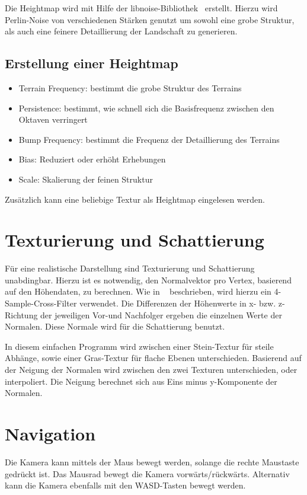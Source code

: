 \documentclass[a4paper,10pt]{article}
\begin{document}
Die Heightmap wird mit Hilfe der libnoise-Bibliothek~\cite{libnoise} erstellt. Hierzu wird Perlin-Noise von verschiedenen Stärken genutzt um sowohl eine grobe Struktur, als auch eine feinere Detaillierung der Landschaft zu generieren. 

\subsection*{Erstellung einer Heightmap}
\begin{itemize}
\item Terrain Frequency: bestimmt die grobe Struktur des Terrains
\item Persistence: bestimmt, wie schnell sich die Basisfrequenz zwischen den Oktaven verringert
\item Bump Frequency: bestimmt die Frequenz der Detaillierung des Terrains
\item Bias: Reduziert oder erhöht Erhebungen
\item Scale: Skalierung der feinen Struktur
\end{itemize}

Zusätzlich kann eine beliebige Textur als Heightmap eingelesen werden.

\section*{Texturierung und Schattierung}

Für eine realistische Darstellung sind Texturierung und Schattierung unabdingbar. Hierzu ist es notwendig, den Normalvektor pro Vertex, basierend auf den Höhendaten, zu berechnen. Wie in ~\cite{frostbite} beschrieben, wird hierzu ein 4-Sample-Cross-Filter verwendet. Die Differenzen der Höhenwerte in x- bzw. z-Richtung der jeweiligen Vor-und Nachfolger ergeben die einzelnen Werte der Normalen. 
Diese Normale wird für die Schattierung benutzt. 

In diesem einfachen Programm wird zwischen einer Stein-Textur für steile Abhänge, sowie einer Gras-Textur für flache Ebenen unterschieden. Basierend auf der Neigung der Normalen wird zwischen den zwei Texturen unterschieden, oder interpoliert. Die Neigung berechnet sich aus Eins minus y-Komponente der Normalen. 

\section*{Navigation}
Die Kamera kann mittels der Maus bewegt werden, solange die rechte Maustaste gedrückt ist. Das Mausrad bewegt die Kamera vorwärts/rückwärts. Alternativ kann die Kamera ebenfalls mit den WASD-Tasten bewegt werden.
\end{document}
